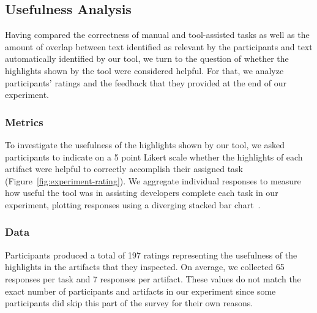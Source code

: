 

\subsection{Usefulness Analysis}
\label{cp6:usefulness}



Having compared the correctness of manual and tool-assisted tasks as well 
as the amount of overlap between text identified as relevant by the participants and 
text automatically identified by our tool, we turn to the question of 
whether the highlights shown by the tool were considered helpful. 
For that, we analyze participants' ratings and the feedback that they 
provided at the end of our experiment.








\subsubsection{Metrics}

To investigate the usefulness of the highlights shown by our tool, we asked participants to indicate on a 5 point Likert scale whether the highlights
of each artifact were helpful to correctly accomplish their assigned task (Figure~\ref{fig:experiment-rating}). We aggregate individual responses to measure how useful the tool was in assisting developers complete each task in our experiment, plotting responses using a diverging stacked bar chart~\cite{spence2001info-viz}.



\subsubsection{Data}


Participants produced a total of 197 ratings representing the usefulness of the highlights in the artifacts that they inspected.
On average, we collected 65 responses per task and 7 responses per artifact.  
These values do not match the exact number of participants and artifacts in our experiment since some participants did skip this part of 
the survey for their own reasons.


